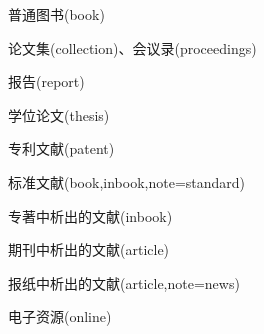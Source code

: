 \begin{refsection}
普通图书(book)
\cite{张伯伟2002--}
\cite{2009-155-155}
\cite{胡承正2010-112-112}
\cite{美国妇产科医师学会2010-38-39}
\cite{1962-50-50}
\cite{汪昂1881--}
\cite{蒋有绪1998--}
\cite{中国企业投资协会2013--}
\cite{罗斯基2009--}
\cite{库恩2012--}
\cite{候文顺2010-119-119}
\cite{CRAWFPRD1995--}
\cite{IFLAI1977--}
\cite{OBRIEN1994--}
\cite{Kinchy2012-50-50}
\cite{Praetzellis2011-13-13}

论文集(collection)、会议录(proceedings)
\cite{中国职工教育研究会1985--}
\cite{中国社会科学院台湾史研究中心2012--}
\cite{雷光春2012--}
\cite{陈志勇2011--}
\cite{Babu2014--}

报告(report)
\cite{中华人民共和国国务院新闻办公室2013-04-16--}
\cite{汤万金2013-09-30--}
\cite{Calkin2011-8-9}
\cite{DTFHA1990--}
\cite{WHO1970--}

学位论文(thesis)
\cite{马欢2011-27-27}
\cite{吴云芳2003--}
\cite{CALMS1965--}

专利文献(patent)
\cite{张凯军2012-04-05--}
\cite{河北绿洲生态环境科技有限公司2001--}
\cite{KOSEKI2002--}

标准文献(book,inbook,note=standard)
\cite{全国信息文献标准化技术委员会2010-3-3}
\cite{全国广播电视标准化技术委员会2007-1-1}
\cite{国家环境保护局科技标准司1996-2-3}
\cite{standardinfoiso158}

专著中析出的文献(inbook)
\cite{1988-590-590}
\cite{白书农1998-146-163}
\cite{汪学军2002-22-25}
\cite{国家标准局信息分类编码研究所1988-59-92}
\cite{1977-49-49}
\cite{楼梦麟2011-11-12}
\cite{BUSECK1980-117-211}
\cite{FOURNEY1971-17-38}

期刊中析出的文献(article)
\cite{杨洪升2013-56-75}
\cite{李炳穆2000-5-8}
\cite{于潇2012-1518-1523}
\cite{陈建军2010-93-93}
\cite{DESMARAIS1992-605-609}
\cite{Saito2006-169-176}
\cite{Walls2013-399-418}
\cite{Franz2013-1053-1062}
\cite{Park2010-696-715}

报纸中析出的文献(article,note=news)
\cite{丁文祥2000--}
\cite{张田勤2000--}
\cite{傅刚2000--}
\cite{刘裕国2013-01-12--}

电子资源(online)
\cite{萧钰2001--}
\cite{李强2012-05-03--}
\cite{Commonwealth--}
\cite{Dublin2012-06-14--}



\end{refsection}
